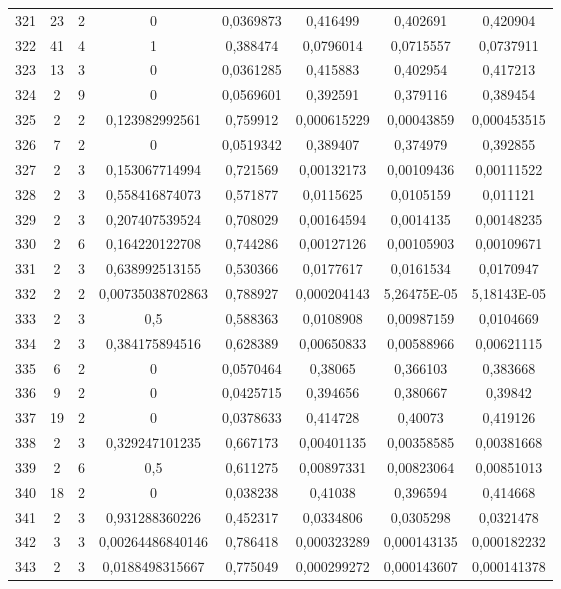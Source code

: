 \begin{longtable}{|c|c|c|c|c|c|c|c|}
321 & 23 & 2 & 0 & 0,0369873 & 0,416499 & 0,402691 & 0,420904  \\
322 & 41 & 4 & 1 & 0,388474 & 0,0796014 & 0,0715557 & 0,0737911  \\
323 & 13 & 3 & 0 & 0,0361285 & 0,415883 & 0,402954 & 0,417213  \\
324 & 2 & 9 & 0 & 0,0569601 & 0,392591 & 0,379116 & 0,389454  \\
325 & 2 & 2 & 0,123982992561 & 0,759912 & 0,000615229 & 0,00043859 & 0,000453515  \\
326 & 7 & 2 & 0 & 0,0519342 & 0,389407 & 0,374979 & 0,392855  \\
327 & 2 & 3 & 0,153067714994 & 0,721569 & 0,00132173 & 0,00109436 & 0,00111522  \\
328 & 2 & 3 & 0,558416874073 & 0,571877 & 0,0115625 & 0,0105159 & 0,011121  \\
329 & 2 & 3 & 0,207407539524 & 0,708029 & 0,00164594 & 0,0014135 & 0,00148235  \\
330 & 2 & 6 & 0,164220122708 & 0,744286 & 0,00127126 & 0,00105903 & 0,00109671  \\
331 & 2 & 3 & 0,638992513155 & 0,530366 & 0,0177617 & 0,0161534 & 0,0170947  \\
332 & 2 & 2 & 0,00735038702863 & 0,788927 & 0,000204143 & 5,26475E-05 & 5,18143E-05  \\
333 & 2 & 3 & 0,5 & 0,588363 & 0,0108908 & 0,00987159 & 0,0104669  \\
334 & 2 & 3 & 0,384175894516 & 0,628389 & 0,00650833 & 0,00588966 & 0,00621115  \\
335 & 6 & 2 & 0 & 0,0570464 & 0,38065 & 0,366103 & 0,383668  \\
336 & 9 & 2 & 0 & 0,0425715 & 0,394656 & 0,380667 & 0,39842  \\
337 & 19 & 2 & 0 & 0,0378633 & 0,414728 & 0,40073 & 0,419126  \\
338 & 2 & 3 & 0,329247101235 & 0,667173 & 0,00401135 & 0,00358585 & 0,00381668  \\
339 & 2 & 6 & 0,5 & 0,611275 & 0,00897331 & 0,00823064 & 0,00851013  \\
340 & 18 & 2 & 0 & 0,038238 & 0,41038 & 0,396594 & 0,414668  \\
341 & 2 & 3 & 0,931288360226 & 0,452317 & 0,0334806 & 0,0305298 & 0,0321478  \\
342 & 3 & 3 & 0,00264486840146 & 0,786418 & 0,000323289 & 0,000143135 & 0,000182232  \\
343 & 2 & 3 & 0,0188498315667 & 0,775049 & 0,000299272 & 0,000143607 & 0,000141378  \\

\end{longtable}
